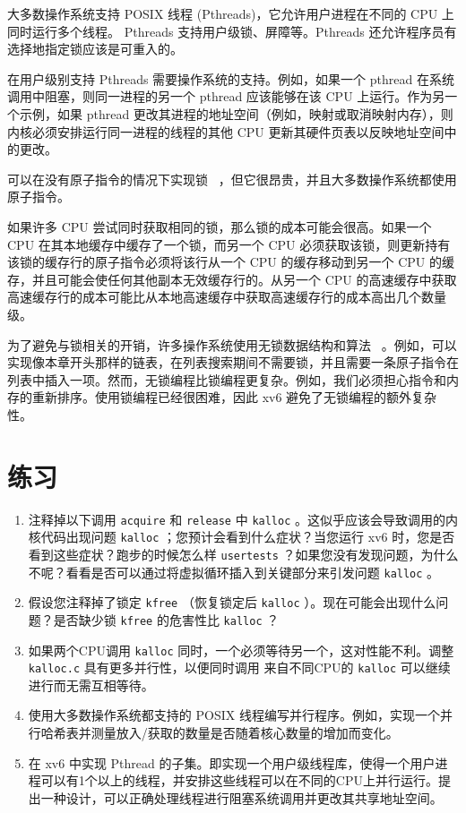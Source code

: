 大多数操作系统支持 POSIX 线程 (Pthreads)，它允许用户进程在不同的 CPU 上同时运行多个线程。 Pthreads 支持用户级锁、屏障等。Pthreads 还允许程序员有选择地指定锁应该是可重入的。  

在用户级别支持 Pthreads 需要操作系统的支持。例如，如果一个 pthread 在系统调用中阻塞，则同一进程的另一个 pthread 应该能够在该 CPU 上运行。作为另一个示例，如果 pthread 更改其进程的地址空间（例如，映射或取消映射内存），则内核必须安排运行同一进程的线程的其他 CPU 更新其硬件页表以反映地址空间中的更改。  

可以在没有原子指令的情况下实现锁~    \cite{lamport:bakery}    ，但它很昂贵，并且大多数操作系统都使用原子指令。  

如果许多 CPU 尝试同时获取相同的锁，那么锁的成本可能会很高。如果一个 CPU 在其本地缓存中缓存了一个锁，而另一个 CPU 必须获取该锁，则更新持有该锁的缓存行的原子指令必须将该行从一个 CPU 的缓存移动到另一个 CPU 的缓存，并且可能会使任何其他副本无效缓存行的。从另一个 CPU 的高速缓存中获取高速缓存行的成本可能比从本地高速缓存中获取高速缓存行的成本高出几个数量级。  

为了避免与锁相关的开销，许多操作系统使用无锁数据结构和算法~    \cite{herlihy:art,mckenney:rcuusage}    。例如，可以实现像本章开头那样的链表，在列表搜索期间不需要锁，并且需要一条原子指令在列表中插入一项。然而，无锁编程比锁编程更复杂。例如，我们必须担心指令和内存的重新排序。使用锁编程已经很困难，因此 xv6 避免了无锁编程的额外复杂性。
    \section{练习  }     

   \begin{enumerate}

 
   \item   注释掉以下调用
    \lstinline{acquire}    和
    \lstinline{release}    中
    \lstinline{kalloc}   
        。这似乎应该会导致调用的内核代码出现问题
    \lstinline{kalloc}    ；您预计会看到什么症状？当您运行 xv6 时，您是否看到这些症状？跑步的时候怎么样
    \lstinline{usertests}   ？如果您没有发现问题，为什么不呢？看看是否可以通过将虚拟循环插入到关键部分来引发问题
    \lstinline{kalloc}    。   \item   假设您注释掉了锁定
    \lstinline{kfree}   （恢复锁定后
    \lstinline{kalloc}   ）。现在可能会出现什么问题？是否缺少锁
    \lstinline{kfree}    的危害性比
    \lstinline{kalloc}   ？   \item   如果两个CPU调用
    \lstinline{kalloc}    同时，一个必须等待另一个，这对性能不利。调整
    \lstinline{kalloc.c}    具有更多并行性，以便同时调用
 来自不同CPU的   \lstinline{kalloc}   可以继续进行而无需互相等待。   \item   使用大多数操作系统都支持的 POSIX 线程编写并行程序。例如，实现一个并行哈希表并测量放入/获取的数量是否随着核心数量的增加而变化。   \item   在 xv6 中实现 Pthread 的子集。即实现一个用户级线程库，使得一个用户进程可以有1个以上的线程，并安排这些线程可以在不同的CPU上并行运行。提出一种设计，可以正确处理线程进行阻塞系统调用并更改其共享地址空间。  \end{enumerate}     


